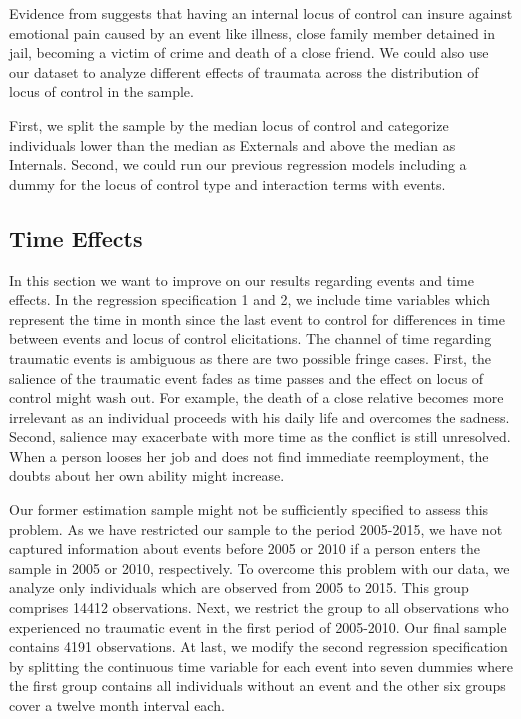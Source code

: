 \documentclass[12pt, a4paper, fleqn, parskip]{scrartcl}
\begin{document}
Evidence from \citet{buddelmeyer2016} suggests that having an internal locus of
control can insure against emotional pain caused by an event like illness,
close family member detained in jail, becoming a victim of crime and death of a
close friend. We could also use our dataset to analyze different effects of
traumata across the distribution of locus of control in the sample.

First, we split the sample by the median locus of control and categorize
individuals lower than the median as Externals and above the median as
Internals. Second, we could run our previous regression models including a
dummy for the locus of control type and interaction terms with events.


\subsection{Time Effects} %
\label{sub:time_effects}

In this section we want to improve on our results regarding events and time
effects. In the regression specification 1 and 2, we include time variables
which represent the time in month since the last event to control for
differences in time between events and locus of control elicitations. The
channel of time regarding traumatic events is ambiguous as there are two
possible fringe cases. First, the salience of the traumatic event fades as time
passes and the effect on locus of control might wash out. For example, the
death of a close relative becomes more irrelevant as an individual proceeds
with his daily life and overcomes the sadness. Second, salience may exacerbate
with more time as the conflict is still unresolved. When a person looses her
job and does not find immediate reemployment, the doubts about her own ability
might increase.

Our former estimation sample might not be sufficiently specified to assess this
problem. As we have restricted our sample to the period 2005-2015, we have not
captured information about events before 2005 or 2010 if a person enters the
sample in 2005 or 2010, respectively. To overcome this problem with our data,
we analyze only individuals which are observed from 2005 to 2015. This group
comprises 14412 observations. Next, we restrict the group to all observations
who experienced no traumatic event in the first period of 2005-2010. Our final
sample contains 4191 observations. At last, we modify the second regression
specification by splitting the continuous time variable for each event into
seven dummies where the first group contains all individuals without an event
and the other six groups cover a twelve month interval each.
\end{document}
